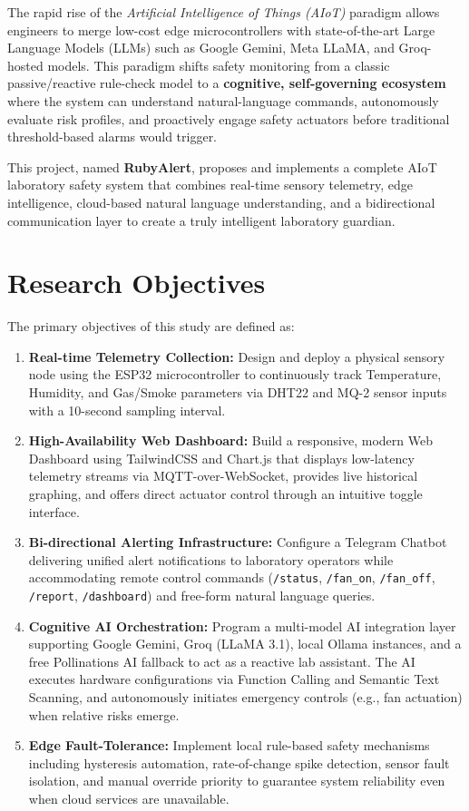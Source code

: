 \documentclass[12pt,a4paper]{report}
\begin{document}
The rapid rise of the \emph{Artificial Intelligence of Things (AIoT)} paradigm allows engineers to merge low-cost edge microcontrollers with state-of-the-art Large Language Models (LLMs) such as Google Gemini, Meta LLaMA, and Groq-hosted models. This paradigm shifts safety monitoring from a classic passive/reactive rule-check model to a \textbf{cognitive, self-governing ecosystem} where the system can understand natural-language commands, autonomously evaluate risk profiles, and proactively engage safety actuators before traditional threshold-based alarms would trigger.

This project, named \textbf{RubyAlert}, proposes and implements a complete AIoT laboratory safety system that combines real-time sensory telemetry, edge intelligence, cloud-based natural language understanding, and a bidirectional communication layer to create a truly intelligent laboratory guardian.

\section{Research Objectives}
The primary objectives of this study are defined as:
\begin{enumerate}[leftmargin=2cm]
    \item \textbf{Real-time Telemetry Collection:} Design and deploy a physical sensory node using the ESP32 microcontroller to continuously track Temperature, Humidity, and Gas/Smoke parameters via DHT22 and MQ-2 sensor inputs with a 10-second sampling interval.
    \item \textbf{High-Availability Web Dashboard:} Build a responsive, modern Web Dashboard using TailwindCSS and Chart.js that displays low-latency telemetry streams via MQTT-over-WebSocket, provides live historical graphing, and offers direct actuator control through an intuitive toggle interface.
    \item \textbf{Bi-directional Alerting Infrastructure:} Configure a Telegram Chatbot delivering unified alert notifications to laboratory operators while accommodating remote control commands (\texttt{/status}, \texttt{/fan\_on}, \texttt{/fan\_off}, \texttt{/report}, \texttt{/dashboard}) and free-form natural language queries.
    \item \textbf{Cognitive AI Orchestration:} Program a multi-model AI integration layer supporting Google Gemini, Groq (LLaMA 3.1), local Ollama instances, and a free Pollinations AI fallback to act as a reactive lab assistant. The AI executes hardware configurations via Function Calling and Semantic Text Scanning, and autonomously initiates emergency controls (e.g., fan actuation) when relative risks emerge.
    \item \textbf{Edge Fault-Tolerance:} Implement local rule-based safety mechanisms including hysteresis automation, rate-of-change spike detection, sensor fault isolation, and manual override priority to guarantee system reliability even when cloud services are unavailable.
\end{enumerate}
\end{document}
